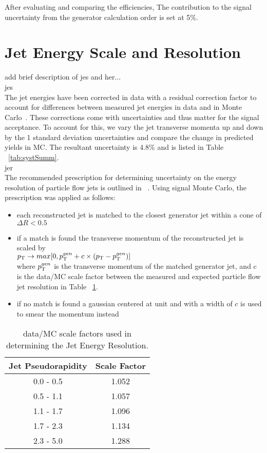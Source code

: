 After evaluating and comparing the efficiencies, The contribution to the signal uncertainty from the generator calculation order is set at 5\%.

\section{Jet Energy Scale and Resolution}
add brief description of jes and her...\\

jes\\
The jet energies have been corrected in data with a residual correction factor to account for differences between measured jet energies in data and in Monte Carlo~\cite{jes_ref}. These corrections come with uncertainties and thus matter for the signal acceptance. To account for this, we vary the jet transverse momenta up and down by the 1 standard deviation uncertainties and compare the change in predicted yields in MC. The resultant uncertainty is 4.8\% and is listed in Table ~\ref{tab:systSumm}.\\

jer\\
The recommended prescription for determining uncertainty on the energy resolution of particle flow jets is outlined in ~\cite{jer_ref}. Using signal Monte Carlo, the prescription was applied as follows:
\begin{itemize}
\item each reconstructed jet is matched to the closest generator jet within a cone of $\Delta R < 0.5$
\item if a match is found the transverse momentum of the reconstructed jet is scaled by \\
$p_{\mathrm{T}} \rightarrow max[0, p_{\mathrm{T}} ^{gen} + c \times (p_{\mathrm{T}} - p_{\mathrm{T}} ^{gen})]$ \\
where $p_{\mathrm{T}} ^{gen}$ is the transverse momentum of the matched generator jet, and c is the data/MC scale factor between the measured and expected particle flow jet resolution in Table ~\ref{tab:jer_scalefactor}.
\item if no match is found a gaussian centered at unit and with a width of $c$ is used to smear the momentum instead
\end{itemize}

\begin{table}[h]
\begin{center}
\caption{\small \label{tab:jer_scalefactor} data/MC scale factors used in determining the Jet Energy Resolution.}
\begin{tabular}{c|c}\hline
Jet Pseudorapidity & Scale Factor \\ \hline \hline
0.0 - 0.5 & 1.052 \\
0.5 - 1.1 & 1.057 \\
1.1 - 1.7 & 1.096 \\
1.7 - 2.3 & 1.134 \\
2.3 - 5.0 & 1.288 \\
\hline
\hline
\end{tabular}
\end{center}
\end{table}


